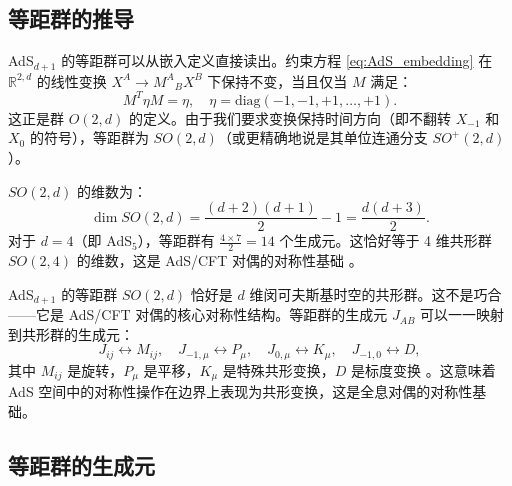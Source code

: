 \subsection{等距群的推导}

AdS$_{d+1}$ 的等距群可以从嵌入定义直接读出。约束方程 \eqref{eq:AdS_embedding} 在 $\mathbb{R}^{2,d}$ 的线性变换 $X^A \to {M^A}_B X^B$ 下保持不变，当且仅当 $M$ 满足：
\begin{equation}
    M^T \eta M = \eta, \quad \eta = \text{diag}(-1,-1,+1,\ldots,+1).
\end{equation}
这正是群 $O(2,d)$ 的定义。由于我们要求变换保持时间方向（即不翻转 $X_{-1}$ 和 $X_0$ 的符号），等距群为 $SO(2,d)$（或更精确地说是其单位连通分支 $SO^+(2,d)$）。

$SO(2,d)$ 的维数为：
\begin{equation}
    \dim SO(2,d) = \frac{(d+2)(d+1)}{2} - 1 = \frac{d(d+3)}{2}.
\end{equation}
对于 $d=4$（即 AdS$_5$），等距群有 $\frac{4 \times 7}{2} = 14$ 个生成元。这恰好等于 4 维共形群 $SO(2,4)$ 的维数，这是 AdS/CFT 对偶的对称性基础 \cite{Maldacena1997}。

\begin{remark}
AdS$_{d+1}$ 的等距群 $SO(2,d)$ 恰好是 $d$ 维闵可夫斯基时空的共形群。这不是巧合——它是 AdS/CFT 对偶的核心对称性结构。等距群的生成元 $J_{AB}$ 可以一一映射到共形群的生成元：
\begin{equation}
    J_{ij} \leftrightarrow M_{ij}, \quad J_{-1,\mu} \leftrightarrow P_\mu, \quad J_{0,\mu} \leftrightarrow K_\mu, \quad J_{-1,0} \leftrightarrow D,
\end{equation}
其中 $M_{ij}$ 是旋转，$P_\mu$ 是平移，$K_\mu$ 是特殊共形变换，$D$ 是标度变换 \cite{Aharony1999}。这意味着 AdS 空间中的对称性操作在边界上表现为共形变换，这是全息对偶的对称性基础。
\end{remark}

\subsection{等距群的生成元}

